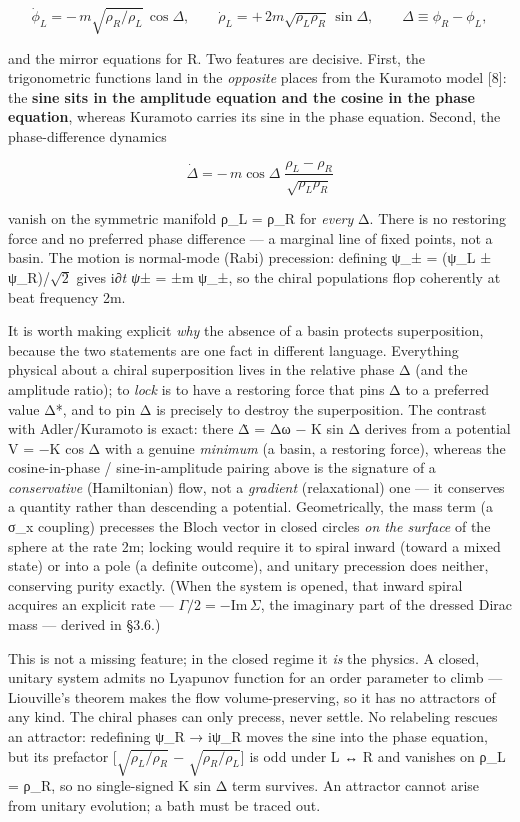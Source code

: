 \documentclass[
]{article}
\begin{document}
\[\dot\phi_L = -\,m\sqrt{\rho_R/\rho_L}\,\cos\Delta, \qquad \dot\rho_L = +\,2m\sqrt{\rho_L\rho_R}\,\sin\Delta, \qquad \Delta \equiv \phi_R - \phi_L,\]

and the mirror equations for R. Two features are decisive. First, the
trigonometric functions land in the \emph{opposite} places from the
Kuramoto model {[}8{]}: the \textbf{sine sits in the amplitude equation
and the cosine in the phase equation}, whereas Kuramoto carries its sine
in the phase equation. Second, the phase-difference dynamics

\[\dot\Delta = -\,m\cos\Delta\;\frac{\rho_L - \rho_R}{\sqrt{\rho_L\rho_R}}\]

vanish on the symmetric manifold ρ\_L = ρ\_R for \emph{every} Δ. There
is no restoring force and no preferred phase difference --- a marginal
line of fixed points, not a basin. The motion is normal-mode (Rabi)
precession: defining ψ\_± = (ψ\_L ± ψ\_R)/\(\sqrt{2}\) gives i∂\emph{t
ψ}± = ±m ψ\_±, so the chiral populations flop coherently at beat
frequency 2m.

It is worth making explicit \emph{why} the absence of a basin protects
superposition, because the two statements are one fact in different
language. Everything physical about a chiral superposition lives in the
relative phase Δ (and the amplitude ratio); to \emph{lock} is to have a
restoring force that pins Δ to a preferred value Δ*, and to pin Δ is
precisely to destroy the superposition. The contrast with Adler/Kuramoto
is exact: there Δ̇ = Δω − K sin Δ derives from a potential V = −K cos Δ
with a genuine \emph{minimum} (a basin, a restoring force), whereas the
cosine-in-phase / sine-in-amplitude pairing above is the signature of a
\emph{conservative} (Hamiltonian) flow, not a \emph{gradient}
(relaxational) one --- it conserves a quantity rather than descending a
potential. Geometrically, the mass term (a σ\_x coupling) precesses the
Bloch vector in closed circles \emph{on the surface} of the sphere at
the rate 2m; locking would require it to spiral inward (toward a mixed
state) or into a pole (a definite outcome), and unitary precession does
neither, conserving purity exactly. (When the system is opened, that
inward spiral acquires an explicit rate ---
\(\Gamma/2 = -\mathrm{Im}\,\Sigma\), the imaginary part of the dressed
Dirac mass --- derived in §3.6.)

This is not a missing feature; in the closed regime it \emph{is} the
physics. A closed, unitary system admits no Lyapunov function for an
order parameter to climb --- Liouville's theorem makes the flow
volume-preserving, so it has no attractors of any kind. The chiral
phases can only precess, never settle. No relabeling rescues an
attractor: redefining ψ\_R → iψ\_R moves the sine into the phase
equation, but its prefactor {[}\(\sqrt{\rho_L/\rho_R}\) −
\(\sqrt{\rho_R/\rho_L}\){]} is odd under L ↔ R and vanishes on ρ\_L =
ρ\_R, so no single-signed K sin Δ term survives. An attractor cannot
arise from unitary evolution; a bath must be traced out.
\end{document}
